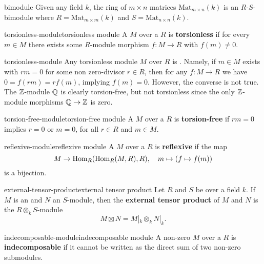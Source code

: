 \begin{example}{bimodule}
    Given any field $k$, the ring of $m \times n$ matrices $\text{Mat}_{m \times n}(k)$ is an $R$-$S$-bimodule where $R = \text{Mat}_{m \times m}(k)$ and $S = \text{Mat}_{n \times n}(k)$.
\end{example}

\begin{topic}{torsionless-module}{torsionless module}
    A  $M$ over a  $R$ is \textbf{torsionless} if for every $m \in M$ there exists some $R$-module morphism $f : M \to R$ with $f(m) \ne 0$.
\end{topic}

\begin{example}{torsionless-module}
    Any torsionless module $M$ over $R$ is . Namely, if $m \in M$ exists with $rm = 0$ for some non zero-divisor $r \in R$, then for any $f : M \to R$ we have $0 = f(rm) = rf(m)$, implying $f(m) = 0$. However, the converse is not true. The $\mathbb{Z}$-module $\mathbb{Q}$ is clearly torsion-free, but not torsionless since the only $\mathbb{Z}$-module morphisms $\mathbb{Q} \to \mathbb{Z}$ is zero.
\end{example}

\begin{topic}{torsion-free-module}{torsion-free module}
    A  $M$ over a  $R$ is \textbf{torsion-free} if $rm = 0$ implies $r = 0$ or $m = 0$, for all $r \in R$ and $m \in M$.
\end{topic}

\begin{topic}{reflexive-module}{reflexive module}
    A  $M$ over a  $R$ is \textbf{reflexive} if the map
    \[ M \to \text{Hom}_R(\text{Hom}_R(M, R), R), \quad m \mapsto (f \mapsto f(m)) \]
    is a bijection.
\end{topic}

\begin{topic}{external-tensor-product}{external tensor product}
    Let $R$ and $S$ be  over a field $k$. If $M$ is an  and $N$ an $S$-module, then the \textbf{external tensor product} of $M$ and $N$ is the $R \otimes_k S$-module
    \[ M \boxtimes N = M|_k \otimes_k N|_k . \]
\end{topic}

\begin{topic}{indecomposable-module}{indecomposable module}
    A non-zero  $M$ over a  $R$ is \textbf{indecomposable} if it cannot be written as the direct sum of two non-zero submodules.
\end{topic}

